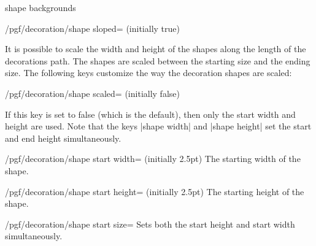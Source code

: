 \begin{decoration}{shape backgrounds}
\begin{key}{/pgf/decoration/shape sloped= (initially true)}
\begin{codeexample}[]
\end{codeexample}
  \end{key}%

  It is possible to scale the width and height of the shapes along the
  length of the decorations path. The shapes are scaled between the starting
  size and the ending size. The following keys customize the way the
  decoration shapes are scaled:
	
  \begin{key}{/pgf/decoration/shape scaled= (initially false)}
\begin{codeexample}[]
\end{codeexample}

    If this key is set to false (which is the default), then only the
    start width and height are used. Note that the keys |shape width|
    and |shape height| set the start and end height simultaneously.
  \end{key}

  \begin{key}{/pgf/decoration/shape start width= (initially 2.5pt)}
    The starting width of the shape.
  \end{key}%

  \begin{key}{/pgf/decoration/shape start height= (initially 2.5pt)}
    The starting height of the shape.
  \end{key}%

  \begin{stylekey}{/pgf/decoration/shape start size=}
    Sets both the start height and start width simultaneously.
  \end{stylekey}%


\end{decoration}
